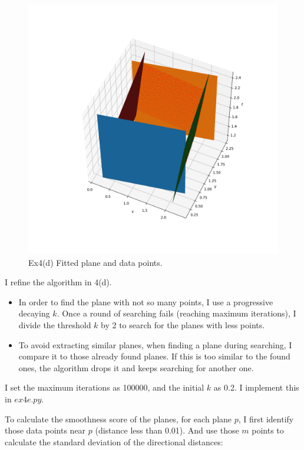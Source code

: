 \documentclass[
  course = {{16-811 Math Fundamentals for Robotics}},
  quartile = {{1}},
  assignment = 3,
  name = {{Kangle Deng}},
  email = {{kangled@andrew.cmu.edu}},
  firstexercise = 1
]{aga-homework}
\begin{document}
\begin{figure}
    \centering
    \includegraphics[width=\textwidth]{math/fig/hw3/ex4d.png}
    \caption{Ex4(d) Fitted plane and data points.}
    \label{fig:hw3_ex4d}
\end{figure}

\subexercise
I refine the algorithm in 4(d). 
\begin{itemize}
    \item In order to find the plane with not so many points, I use a progressive decaying $k$. Once a round of searching fails (reaching maximum iterations), I divide the threshold $k$ by 2 to search for the planes with less points.
    \item To avoid extracting similar planes, when finding a plane during searching, I compare it to those already found planes. If this is too similar to the found ones, the algorithm drops it and keeps searching for another one.
\end{itemize}

I set the maximum iterations as 100000, and the initial $k$ as 0.2. I implement this in $ex4e.py$.

To calculate the smoothness score of the planes, for each plane $p$, I first identify those data points near $p$ (distance less than 0.01). And use those $m$ points to calculate the standard deviation of the directional distances:
\end{document}
